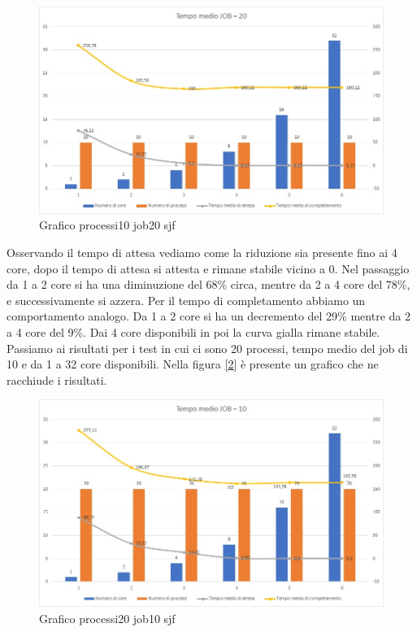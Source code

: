 \documentclass[Lau, oneside]{sapthesis}%
\begin{document}
\begin{figure}[ht!]
  \centering
  \includegraphics[width=1\textwidth]{Grafico processi10 job20 sjf.jpg}
  \caption{Grafico processi10 job20 sjf}
  \label{figura:p10j20sjf}
\end{figure}
Osservando il tempo di attesa vediamo come la riduzione sia presente fino ai 4 core, dopo il tempo di attesa si attesta e rimane stabile vicino a 0.
Nel passaggio da 1 a 2 core si ha una diminuzione del 68\% circa, mentre da 2 a 4 core del 78\%, e successivamente si azzera.
Per il tempo di completamento abbiamo un comportamento analogo.
Da 1 a 2 core si ha un decremento del 29\% mentre da 2 a 4 core del 9\%.
Dai 4 core disponibili in poi la curva gialla rimane stabile.
Passiamo ai risultati per i test in cui ci sono 20 processi, tempo medio del job di 10 e da 1 a 32 core disponibili.
Nella figura \hyperref[figura:p20j10sjf]{[\ref*{figura:p20j10sjf}]} è presente un grafico che ne racchiude i risultati.
\begin{figure}[ht!]
  \centering
  \includegraphics[width=1\textwidth]{Grafico processi20 job10 sjf.jpg}
  \caption{Grafico processi20 job10 sjf}
  \label{figura:p20j10sjf}
\end{figure}
\end{document}
